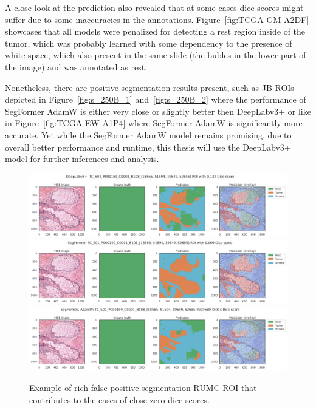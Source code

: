 A close look at the prediction also revealed that at some cases dice scores might suffer due to some inaccuracies
in the annotations. Figure~\ref*{fig:TCGA-GM-A2DF} showcases that all models were
penalized for detecting a rest region inside of the tumor, which was probably learned
with some dependency to the presence of white space, which also present in the same slide
(the bubles in the lower part of the image) and was annotated as rest.

Nonetheless, there are positive segmentation results present, such as JB ROIs depicted in
Figure~\ref*{fig:s_250B_1} and~\ref*{fig:s_250B_2} where the performance of SegFormer AdamW
is either very close or slightly better then DeepLabv3+ or like in Figure~\ref*{fig:TCGA-EW-A1P4}
where SegFormer AdamW is significantly more accurate. Yet while 
the SegFormer AdamW model remains promising, due to overall better performance and
runtime, this thesis will use the DeepLabv3+ model for further inferences and analysis.

\begin{figure}[H]
    \includegraphics[width=\linewidth]{figures/tissue/deeplabv3+_dice_tc_TC_S01_P000159_C0001_B108_[18565,_51594,_19649,_52655]_check.png}
    \includegraphics[width=\linewidth]{figures/tissue/segformer_dice_tc_TC_S01_P000159_C0001_B108_[18565,_51594,_19649,_52655]_check.png}
    \includegraphics[width=\linewidth]{figures/tissue/segformer,_adamw_dice_tc_TC_S01_P000159_C0001_B108_[18565,_51594,_19649,_52655]_check.png}
    \caption{Example of rich false positive segmentation RUMC ROI that contributes to the cases of close zero dice scores.}
    \label{fig:TC_S01_P000159}
\end{figure}

